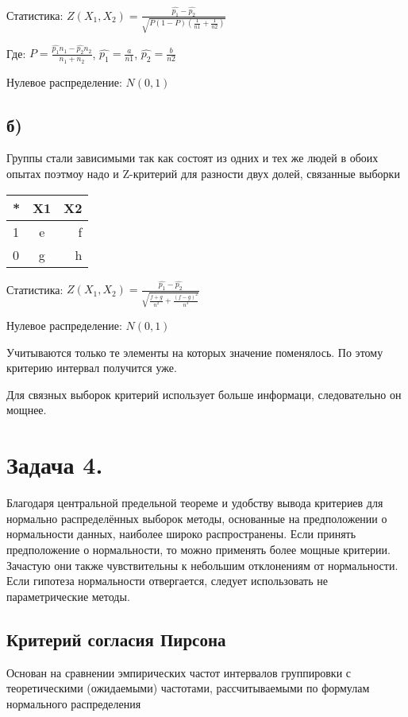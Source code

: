 \documentclass[10pt,reqno]{amsart}
\theoremstyle{definition}
\theoremstyle{remark}
\newcommand{\lfrac} [2] {\displaystyle \frac{#1}{#2}}
\begin{document}
Статистика: $Z(X_1, X_2) = \lfrac{\widehat{p_1} - \widehat{p_2}}{\sqrt{P(1 - P) \left( \frac{1}{n1} + \frac{1}{n2}\right)}}$

Где: $P = \lfrac{\widehat{p_1}n_1 - \widehat{p_2}n_2}{n_1 + n_2}$, $\widehat{p_1} = \lfrac{a}{n1}$, $\widehat{p_2} = \lfrac{b}{n2}$

Нулевое распределение: $N(0,1)$

\subsection*{б)}
Группы стали зависимыми так как состоят из одних и тех же людей в обоих опытах поэтмоу надо и Z-критерий для разности двух долей, связанные выборки

\begin{tabular}{| l | c | r |}
	\hline
	* & X1 & X2 \\
	\hline
	1 & e & f \\
	\hline
	0 & g & h \\
	\hline
\end{tabular}

Статистика: $Z(X_1, X_2) = \lfrac{\widehat{p_1} - \widehat{p_2}}{\sqrt{\frac{f + g}{n^2} + \frac{(f - g)^2}{n^3}}}$

Нулевое распределение: $N(0,1)$

Учитываются только те элементы на которых значение поменялось. По этому критерию интервал получится уже.

Для связных выборок критерий использует больше информаци, следовательно он мощнее.


\section*{Задача 4.}

Благодаря центральной предельной теореме и удобству вывода критериев для нормально распределённых выборок методы, основанные на предположении о нормальности данных, наиболее широко распространены. Если принять предположение о нормальности, то можно применять более мощные критерии. Зачастую они также чувствительны к небольшим отклонениям от нормальности. Если гипотеза нормальности отвергается, следует использовать не параметрические методы.

\subsection*{Критерий согласия Пирсона}
Основан на сравнении эмпирических частот интервалов группировки с теоретическими (ожидаемыми) частотами, рассчитываемыми по формулам нормального распределения
\end{document}
